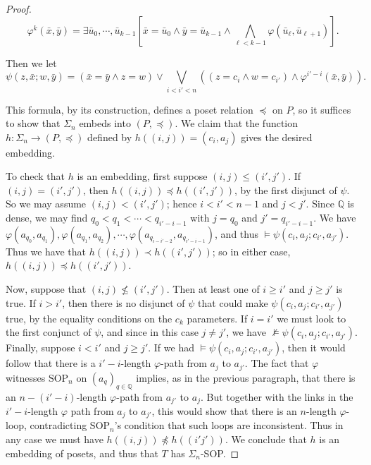 \documentclass{article}
\newcommand{\bbQ}{\mathbb{Q}}
\newcommand{\SOP}{\text{SOP}}
\newcommand{\vphi}{\varphi}
\theoremstyle{definition}
\theoremstyle{definition}
\theoremstyle{definition}
\begin{document}
\begin{proof}
$$\vphi^k(\bar{x}, \bar{y})=\exists \bar{u}_0,\dotsm, \bar{u}_{k-1}\left[\bar{x}=\bar{u}_0\land \bar{y}=\bar{u}_{k-1}\land \bigwedge_{\ell<k-1}\vphi(\bar{u}_\ell, \bar{u}_{\ell+1})\right].$$

Then we let 
    \[\psi(z,\bar{x};w,\bar{y})=(\bar{x}=\bar{y}\land z=w)\lor\bigvee_{i<i'<n}\left((z=c_i
    \land w=c_{i'})\land \vphi^{i'-i}(\bar{x},\bar{y})\right).\]

    This formula, by its construction, defines a poset relation $\preceq$ on $P$, so it suffices to show that $\Sigma_n$ embeds into $(P,\preceq)$. We claim that the function $h\colon \Sigma_n\to (P,\preceq)$ defined by $h((i,j))=(c_i, a_j)$ gives the desired embedding.

    To check that $h$ is an embedding, first suppose $(i,j)\leq(i',j')$. If $(i,j)=(i',j')$, then $h((i,j))\preceq h((i',j'))$, by the first disjunct of $\psi$. So we may assume $(i,j)<(i',j')$; hence $i<i' <n-1$ and $j<j'$. Since $\bbQ$ is dense, we may find $q_0<q_1<\dotsm <q_{i'-i-1}$ with $j=q_0$ and $j'=q_{i'-i-1}$. We have $\vphi(a_{q_0}, a_{q_1}), \vphi(a_{q_1},a_{q_2}),\dotsm, \vphi(a_{q_{i-i'-2}},a_{q_{i'-i-1}})$, and thus $\models \psi(c_i,a_j;c_{i'},a_{j'})$. Thus we have that $h((i,j))\prec h((i',j'))$; so in either case, $h((i,j))\preceq h((i',j'))$.
    
    Now, suppose that $(i,j)\not\leq(i',j')$. Then at least one of $i\geq i'$ and $j\geq j'$ is true. If $i>i'$, then there is no disjunct of $\psi$ that could make $\psi(c_i,a_j;c_{i'},a_{j'})$ true, by the equality conditions on the $c_k$ parameters. If $i=i'$ we must look to the first conjunct of $\psi$, and since in this case $j\neq j'$, we have $\not\models \psi(c_i,a_j;c_{i'},a_{j'})$. Finally, suppose $i<i'$ and $j\geq j'$. If we had $\models \psi(c_i,a_j;c_{i'},a_{j'})$, then it would follow that there is a $i'-i$-length $\vphi$-path from $a_{j}$ to $a_{j'}$. The fact that $\vphi$ witnesses $\SOP_n$ on $(a_q)_{q\in\bbQ}$ implies, as in the previous paragraph, that there is an $n-(i'-i)$-length $\varphi$-path from $a_{j'}$ to $a_{j}$. But together with the links in the $i'-i$-length $\vphi$ path from $a_{j}$ to $a_{j'}$, this would show that there is an $n$-length $\vphi$-loop, contradicting $\SOP_n$'s condition that such loops are inconsistent. Thus in any case we must have $h((i,j))\not\preceq h((i'j'))$. We conclude that $h$ is an embedding of posets, and thus that $T$ has $\Sigma_n$-SOP.
    
\end{proof}
\end{document}
